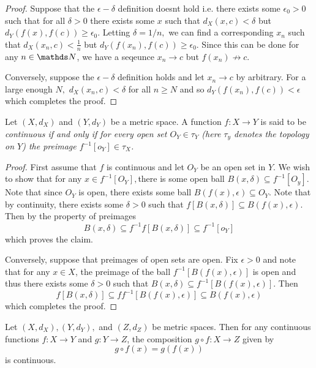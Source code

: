 \begin{proof}
Suppose that the $\epsilon-\delta$ definition doesnt hold i.e. there
exists some $\epsilon_{0}>0$ such that for all $\delta>0$ there
exists some $x$ such that $d_{X}\left(x,c\right)<\delta$ but $d_{Y}\left(f\left(x\right),f\left(c\right)\right)\geq\epsilon_{0}.$
Letting $\delta=1/n,$ we can find a corresponding $x_{n}$ such that
$d_{X}\left(x_{n},c\right)<\frac{1}{n}$ but $d_{Y}\left(f\left(x_{n}\right),f\left(c\right)\right)\geq\epsilon_{0}$.
Since this can be done for any $n\in\N$, we have a seqeunce $x_{n}\to c$
but $f\left(x_{n}\right)\not\to c$.

Conversely, suppose the $\epsilon-\delta$ definition holds and let
$x_{n}\to c$ by arbitrary. For a large enough $N,$ $d_{X}\left(x_{n},c\right)<\delta$
for all $n\geq N$ and so $d_{Y}\left(f\left(x_{n}\right),f\left(c\right)\right)<\epsilon$
which completes the proof.
\end{proof}
\begin{prop}
\label{prop:openPreImageMetric}Let $\left(X,d_{X}\right)$ and $\left(Y,d_{Y}\right)$
be a metric space. A function $f:X\to Y$ is said to be \emph{continuous
if and only if for every open set $O_{Y}\in\tau_{Y}$ (here $\tau_{y}$
denotes the topology on $Y$) the preimage $f^{-1}\left[o_{Y}\right]\in\tau_{X}$.}
\end{prop}

\begin{proof}
First assume that $f$ is continuous and let $O_{Y}$ be an open set
in $Y$. We wish to show that for any $x\in f^{-1}\left[O_{Y}\right],$there
is some open ball $B\left(x,\delta\right)\subseteq f^{-1}\left[O_{y}\right].$
Note that since $O_{Y}$ is open, there exists some ball $B\left(f\left(x\right),\epsilon\right)\subseteq O_{Y}.$
Note that by continuity, there exists some $\delta>0$ such that $f\left[B\left(x,\delta\right)\right]\subseteq B\left(f\left(x\right),\epsilon\right)$.
Then by the property of preimages
\[
B\left(x,\delta\right)\subseteq f^{-1}f\left[B\left(x,\delta\right)\right]\subseteq f^{-1}\left[o_{Y}\right]
\]
which proves the claim.

Conversely, suppose that preimages of open sets are open. Fix $\epsilon>0$
and note that for any $x\in X$, the preimage of the ball $f^{-1}\left[B\left(f\left(x\right),\epsilon\right)\right]$
is open and thus there exists some $\delta>0$ such that $B\left(x,\delta\right)\subseteq f^{-1}\left[B\left(f\left(x\right),\epsilon\right)\right].$
Then
\[
f\left[B\left(x,\delta\right)\right]\subseteq ff^{-1}\left[B\left(f\left(x\right),\epsilon\right)\right]\subseteq B\left(f\left(x\right),\epsilon\right)
\]
which completes the proof.
\end{proof}
\begin{prop}
Let $\left(X,d_{X}\right),\left(Y,d_{Y}\right),$ and $\left(Z,d_{Z}\right)$
be metric spaces. Then for any continuous functions $f:X\to Y$ and
$g:Y\to Z$, the composition $g\circ f:X\to Z$ given by
\[
g\circ f\left(x\right)=g\left(f\left(x\right)\right)
\]
is continuous.
\end{prop}

